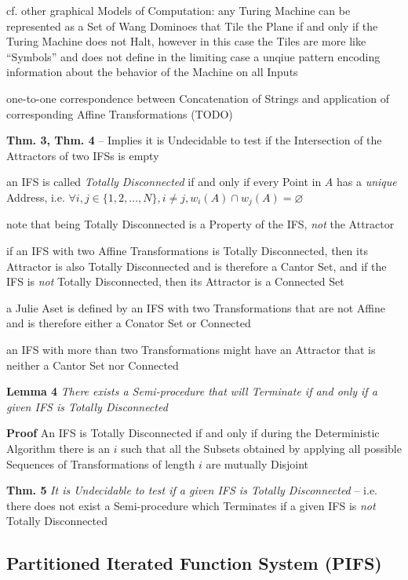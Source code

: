 cf. other graphical Models of Computation: any Turing Machine can be represented
as a Set of Wang Dominoes that Tile the Plane if and only if the Turing Machine
does not Halt, however in this case the Tiles are more like ``Symbols'' and does
not define in the limiting case a unqiue pattern encoding information about the
behavior of the Machine on all Inputs

one-to-one correspondence between Concatenation of Strings and application of
corresponding Affine Transformations (TODO)

\textbf{Thm. 3, Thm. 4} -- Implies it is Undecidable to test if the Intersection
of the Attractors of two IFSs is empty

an IFS is called \emph{Totally Disconnected} if and only if every Point in $A$
has a \emph{unique} Address, i.e.
$\forall i, j \in \{1, 2, \ldots, N\}, i \neq j, w_i(A) \cap w_j(A) = \varnothing$

note that being Totally Disconnected is a Property of the IFS, \emph{not} the
Attractor

if an IFS with two Affine Transformations is Totally Disconnected, then its
Attractor is also Totally Disconnected and is therefore a Cantor Set, and if the
IFS is \emph{not} Totally Disconnected, then its Attractor is a Connected Set

a Julie Aset is defined by an IFS with two Transformations that are not Affine
and is therefore either a Conator Set or Connected

an IFS with more than two Transformations might have an Attractor that is
neither a Cantor Set nor Connected

\textbf{Lemma 4} \emph{There exists a Semi-procedure that will Terminate if and
  only if a given IFS is Totally Disconnected}

\textbf{Proof} An IFS is Totally Disconnected if and only if during the
Deterministic Algorithm there is an $i$ such that all the Subsets obtained by
applying all possible Sequences of Transformations of length $i$ are mutually
Disjoint

\textbf{Thm. 5} \emph{It is Undecidable to test if a given IFS is Totally
  Disconnected}
-- i.e. there does not exist a Semi-procedure which Terminates if a given IFS is
\emph{not} Totally Disconnected



\subsection{Partitioned Iterated Function System (PIFS)}\label{sec:pifs}

